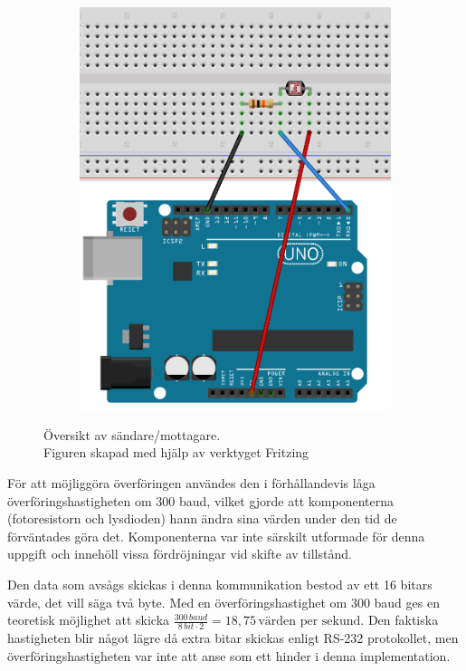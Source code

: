 \begin{figure}
\begin{subfigure}[b]{0.35\textwidth}
                    \includegraphics[width=\textwidth]{res/img/resistor}    
                \end{subfigure}
            \caption[Översikt av sändare/mottagare]{Översikt av sändare/mottagare. \\\tiny{Figuren skapad med hjälp av verktyget Fritzing \cite{fritz}}}\label{fig:schema}
            \end{figure}

            För att möjliggöra överföringen användes den i förhållandevis låga överföringshastigheten om 300 baud, vilket gjorde att komponenterna (fotoresistorn och lysdioden) hann ändra sina värden under den tid de förväntades göra det. Komponenterna var inte särskilt utformade för denna uppgift och innehöll vissa fördröjningar vid skifte av tillstånd. \bigskip

            Den data som avsågs skickas i denna kommunikation bestod av ett 16 bitars värde, det vill säga två byte. Med en överföringshastighet om 300 baud ges en teoretisk möjlighet att skicka $\frac{300 \,\textit{baud}}{8 \, bit \cdot 2} = 18,75 \, \text{värden per sekund}$. Den faktiska hastigheten blir något lägre då extra bitar skickas enligt RS-232 protokollet, men överföringshastigheten var inte att anse som ett hinder i denna implementation. \bigskip
            
